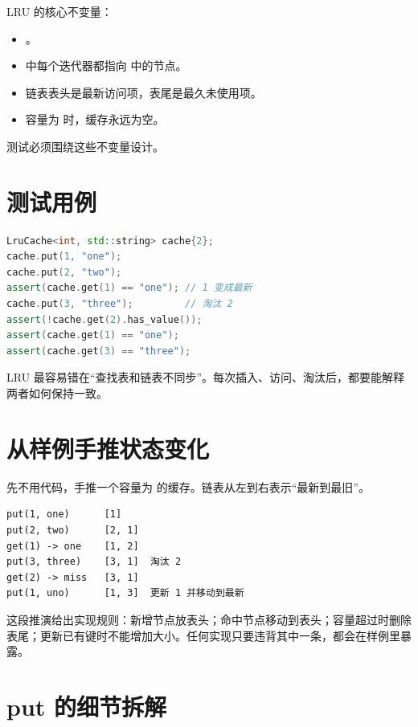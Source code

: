 LRU 的核心不变量：

\begin{itemize}
  \item {}。
  \item {} 中每个迭代器都指向  中的节点。
  \item 链表表头是最新访问项，表尾是最久未使用项。
  \item 容量为  时，缓存永远为空。
\end{itemize}

测试必须围绕这些不变量设计。

\section{测试用例}

\begin{lstlisting}[language=C++,caption={LRU 行为测试思路}]
LruCache<int, std::string> cache{2};
cache.put(1, "one");
cache.put(2, "two");
assert(cache.get(1) == "one"); // 1 变成最新
cache.put(3, "three");         // 淘汰 2
assert(!cache.get(2).has_value());
assert(cache.get(1) == "one");
assert(cache.get(3) == "three");
\end{lstlisting}

\begin{warningbox}
LRU 最容易错在“查找表和链表不同步”。每次插入、访问、淘汰后，都要能解释两者如何保持一致。
\end{warningbox}

\section{从样例手推状态变化}

先不用代码，手推一个容量为  的缓存。链表从左到右表示“最新到最旧”。

\begin{lstlisting}[caption={LRU 状态推演}]
put(1, one)      [1]
put(2, two)      [2, 1]
get(1) -> one    [1, 2]
put(3, three)    [3, 1]  淘汰 2
get(2) -> miss   [3, 1]
put(1, uno)      [1, 3]  更新 1 并移动到最新
\end{lstlisting}

这段推演给出实现规则：新增节点放表头；命中节点移动到表头；容量超过时删除表尾；更新已有键时不能增加大小。任何实现只要违背其中一条，都会在样例里暴露。

\section{put 的细节拆解}

